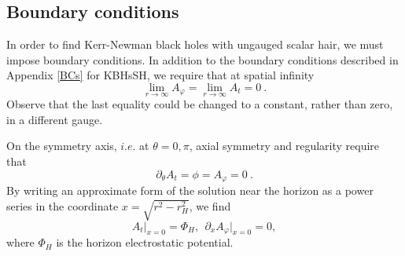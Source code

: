 \subsection{Boundary conditions}
\label{KNBCs}
In order to find Kerr-Newman black holes with ungauged scalar hair, we must impose boundary conditions.
In addition to the boundary conditions described in Appendix \ref{BCs} for KBHsSH, we require that at spatial infinity
\begin{equation}
  \lim_{r\rightarrow\infty}A_\varphi=\lim_{r\rightarrow\infty}A_t=0\ .
\end{equation}
Observe that the last equality could be changed to a constant, rather than zero, in a different gauge.

On the symmetry axis, $i.e.$ at $\theta=0,\pi$, axial symmetry and regularity require that
\begin{equation}
  \label{ABCs}
  \partial_\theta A_t = \phi = A_\varphi = 0\ .
\end{equation} 
By writing an approximate form of the solution near the horizon as a power series in the coordinate $x=\sqrt{r^2-r_H^2}$, we find
\begin{equation}
  A_t \big|_{x=0} =  \Phi_H,~~ \partial_x A_\varphi \big|_{x=0}=0 ,
\end{equation}
where $\Phi_H$ is the horizon electrostatic potential. 
%
%
